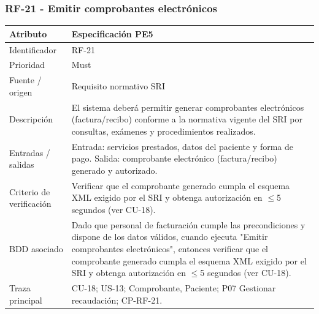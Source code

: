 \documentclass[11pt,a4paper]{article}
\begin{document}
	\subsubsection{RF-21 - Emitir comprobantes electrónicos}
	\begin{tabularx}{\textwidth}{p{3.2cm}Y}
		\toprule
		\textbf{Atributo} & \textbf{Especificación PE5}\\\midrule
		Identificador & RF-21\\
		Prioridad & Must\\
		Fuente / origen & Requisito normativo SRI\\
		Descripción & El sistema deberá permitir generar comprobantes electrónicos (factura/recibo) conforme a la normativa vigente del SRI por consultas, exámenes y procedimientos realizados.\\
		Entradas / salidas & Entrada: servicios prestados, datos del paciente y forma de pago. Salida: comprobante electrónico (factura/recibo) generado y autorizado.\\
		Criterio de verificación & Verificar que el comprobante generado cumpla el esquema XML exigido por el SRI y obtenga autorización en $\leq$5 segundos (ver CU-18).\\
		BDD asociado & Dado que personal de facturación cumple las precondiciones y dispone de los datos válidos, cuando ejecuta "Emitir comprobantes electrónicos", entonces verificar que el comprobante generado cumpla el esquema XML exigido por el SRI y obtenga autorización en $\leq$5 segundos (ver CU-18).\\
		Traza principal & CU-18; US-13; Comprobante, Paciente; P07 Gestionar recaudación; CP-RF-21.\\
		\bottomrule
	\end{tabularx}
\end{document}
